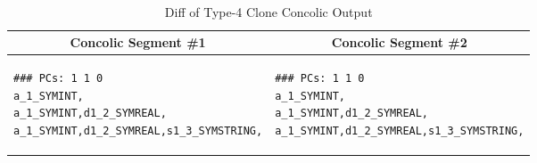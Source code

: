 \noindent
\begin{table}[h] %
\caption{Diff of Type-4 Clone Concolic Output}
~\label{table:concolicoutputcomparision}
\centering
\begin{tabular}{ p{3.8cm} | p{3.8cm} }
\multicolumn{1}{c}{\textbf{Concolic Segment \#1}} & \multicolumn{1}{c}{\textbf{Concolic Segment \#2}} \\ \hline \hline
\begin{lstlisting}[style=ConcolicOutput]
### PCs: 1 1 0
a_1_SYMINT,
a_1_SYMINT,d1_2_SYMREAL,
a_1_SYMINT,d1_2_SYMREAL,s1_3_SYMSTRING,
\end{lstlisting}
&
\begin{lstlisting}[style=ConcolicOutput]
### PCs: 1 1 0
a_1_SYMINT,
a_1_SYMINT,d1_2_SYMREAL,
a_1_SYMINT,d1_2_SYMREAL,s1_3_SYMSTRING,
\end{lstlisting}

\end{tabular}
\label{fig:exampleoutput}
\end{table}






